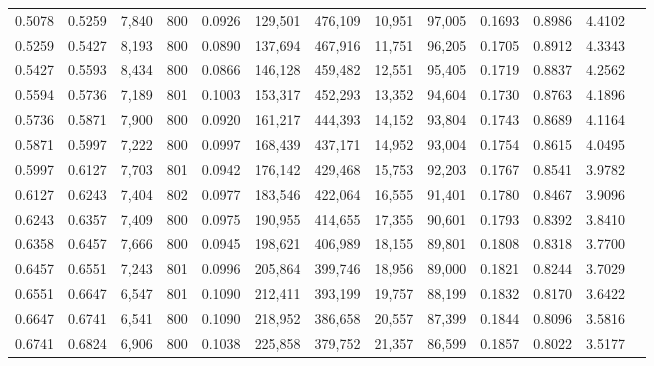 \begin{tabular}{rrrrrrrrrrrrr}
0.5078 & 0.5259 &  7,840 & 800 &                                     0.0926 & 129,501 & 476,109 &  10,951 &  97,005 & 0.1693 & 0.8986 & 4.4102 \\
0.5259 & 0.5427 &  8,193 & 800 &                                     0.0890 & 137,694 & 467,916 &  11,751 &  96,205 & 0.1705 & 0.8912 & 4.3343 \\
0.5427 & 0.5593 &  8,434 & 800 &                                     0.0866 & 146,128 & 459,482 &  12,551 &  95,405 & 0.1719 & 0.8837 & 4.2562 \\
0.5594 & 0.5736 &  7,189 & 801 &                                     0.1003 & 153,317 & 452,293 &  13,352 &  94,604 & 0.1730 & 0.8763 & 4.1896 \\
0.5736 & 0.5871 &  7,900 & 800 &                                     0.0920 & 161,217 & 444,393 &  14,152 &  93,804 & 0.1743 & 0.8689 & 4.1164 \\
0.5871 & 0.5997 &  7,222 & 800 &                                     0.0997 & 168,439 & 437,171 &  14,952 &  93,004 & 0.1754 & 0.8615 & 4.0495 \\
0.5997 & 0.6127 &  7,703 & 801 &                                     0.0942 & 176,142 & 429,468 &  15,753 &  92,203 & 0.1767 & 0.8541 & 3.9782 \\
0.6127 & 0.6243 &  7,404 & 802 &                                     0.0977 & 183,546 & 422,064 &  16,555 &  91,401 & 0.1780 & 0.8467 & 3.9096 \\
0.6243 & 0.6357 &  7,409 & 800 &                                     0.0975 & 190,955 & 414,655 &  17,355 &  90,601 & 0.1793 & 0.8392 & 3.8410 \\
0.6358 & 0.6457 &  7,666 & 800 &                                     0.0945 & 198,621 & 406,989 &  18,155 &  89,801 & 0.1808 & 0.8318 & 3.7700 \\
0.6457 & 0.6551 &  7,243 & 801 &                                     0.0996 & 205,864 & 399,746 &  18,956 &  89,000 & 0.1821 & 0.8244 & 3.7029 \\
0.6551 & 0.6647 &  6,547 & 801 &                                     0.1090 & 212,411 & 393,199 &  19,757 &  88,199 & 0.1832 & 0.8170 & 3.6422 \\
0.6647 & 0.6741 &  6,541 & 800 &                                     0.1090 & 218,952 & 386,658 &  20,557 &  87,399 & 0.1844 & 0.8096 & 3.5816 \\
0.6741 & 0.6824 &  6,906 & 800 &                                     0.1038 & 225,858 & 379,752 &  21,357 &  86,599 & 0.1857 & 0.8022 & 3.5177 \\

\end{tabular}
